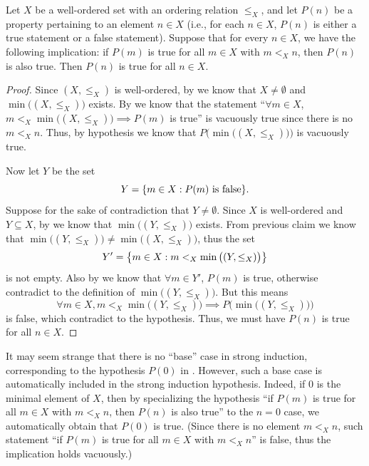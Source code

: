 \begin{prop}\label{i:8.5.10}
  Let \(X\) be a well-ordered set with an ordering relation \(\leq_X\), and let \(P(n)\) be a property pertaining to an element \(n \in X\)
  (i.e., for each \(n \in X\), \(P(n)\) is either a true statement or a false statement).
  Suppose that for every \(n \in X\), we have the following implication:
  if \(P(m)\) is true for all \(m \in X\) with \(m <_X n\), then \(P(n)\) is also true.
  Then \(P(n)\) is true for all \(n \in X\).
\end{prop}

\begin{proof}
  Since \((X, \leq_X)\) is well-ordered, by  we know that \(X \neq \emptyset\) and \(\min\big((X, \leq_X)\big)\) exists.
  By  we know that the statement ``\(\forall m \in X\), \(m <_X \min\big((X, \leq_X)\big) \implies P(m)\) is true'' is vacuously true since there is no \(m <_X n\).
  Thus, by hypothesis we know that \(P\Big(\min\big((X, \leq_X)\big)\Big)\) is vacuously true.

  Now let \(Y\) be the set
  \[
    Y = \set{m \in X : P(m) \text{ is false}}.
  \]
  Suppose for the sake of contradiction that \(Y \neq \emptyset\).
  Since \(X\) is well-ordered and \(Y \subseteq X\), by  we know that \(\min\big((Y, \leq_X)\big)\) exists.
  From previous claim we know that \(\min\big((Y, \leq_X)\big) \neq \min\big((X, \leq_X)\big)\), thus the set
  \[
    Y' = \left\lbrace m \in X : m <_X \min\big((Y, \leq_X)\big)\right\rbrace
  \]
  is not empty.
  Also by  we know that \(\forall m \in Y'\), \(P(m)\) is true, otherwise contradict to the definition of \(\min\big((Y, \leq_X)\big)\).
  But this means
  \[
    \forall m \in X, m <_X \min\big((Y, \leq_X)\big) \implies P\Big(\min\big((Y, \leq_X)\big)\Big)
  \]
  is false, which contradict to the hypothesis.
  Thus, we must have \(P(n)\) is true for all \(n \in X\).
\end{proof}

\begin{rmk}\label{i:8.5.11}
  It may seem strange that there is no ``base'' case in strong induction, corresponding to the hypothesis \(P(0)\) in .
  However, such a base case is automatically included in the strong induction hypothesis.
  Indeed, if \(0\) is the minimal element of \(X\), then by specializing the hypothesis ``if \(P(m)\) is true for all \(m \in X\) with \(m <_X n\), then \(P(n)\) is also true'' to the \(n = 0\) case, we automatically obtain that \(P(0)\) is true.
  (Since there is no element \(m <_X n\), such statement ``if \(P(m)\) is true for all \(m \in X\) with \(m <_X n\)'' is false, thus the implication holds vacuously.)
\end{rmk}

